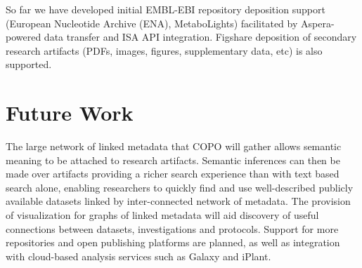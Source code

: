 \documentclass[runningheads,a4paper]{llncs}
\begin{document}
So far we have developed initial EMBL-EBI repository deposition support (European Nucleotide Archive (ENA), MetaboLights) facilitated by Aspera-powered data transfer and ISA API integration. Figshare deposition of secondary research artifacts (PDFs, images, figures, supplementary data, etc) is also supported.

\vspace*{-0.1in}
\section{Future Work}

The large network of linked metadata that COPO will gather allows semantic meaning to be attached to research artifacts. Semantic inferences can then be made over artifacts providing a richer search experience than with text based search alone, enabling researchers to quickly find and use well-described publicly available datasets linked by inter-connected network of metadata. The provision of visualization for graphs of linked metadata will aid discovery of useful connections between datasets, investigations and protocols. Support for more repositories and open publishing platforms are planned, as well as integration with cloud-based analysis services such as Galaxy and iPlant.
\end{document}
